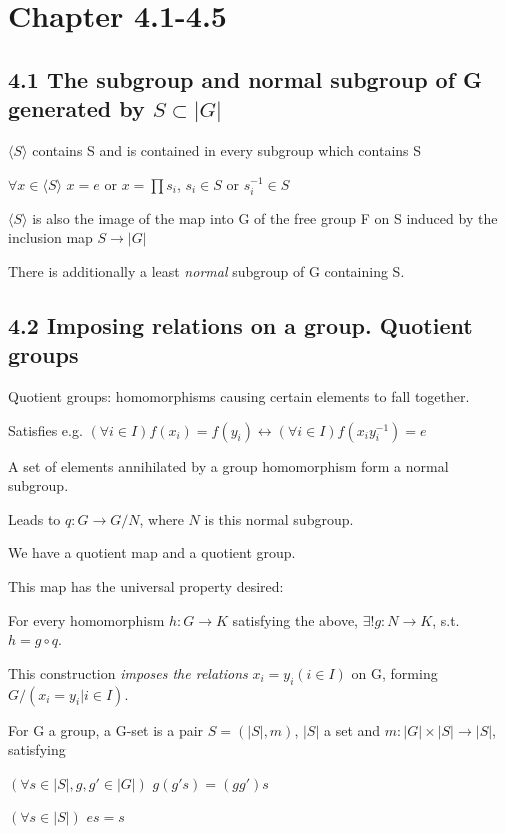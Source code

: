 \documentclass[12pt]{article}
\begin{document}
\section{Chapter 4.1-4.5}

\subsection{4.1 The subgroup and normal subgroup of G generated by $S \subset |G|$}


$\langle S \rangle$ contains S and is contained in every subgroup which contains S

$\forall x \in \langle S \rangle$ $x = e$ or $x = \prod s_i$, $s_i \in S$ or $s_i^{-1} \in S$

$\langle S \rangle$ is also the image of the map into G of the free group F on S induced by the inclusion map $S \to |G|$

There is additionally a least \textit{normal} subgroup of G containing S.

\subsection{4.2 Imposing relations on a group. Quotient groups}

Quotient groups: homomorphisms causing certain elements to fall together.

Satisfies e.g. $(\forall i \in I) f(x_i) = f(y_i) \leftrightarrow (\forall i \in I) f(x_iy_i^{-1}) = e$

A set of elements annihilated by a group homomorphism form a normal subgroup.

Leads to $q: G \to G\slash N$, where $N$ is this normal subgroup.

We have a quotient map and a quotient group.

\noindent
This map has the universal property desired:

For every homomorphism $h: G \to K$ satisfying the above, $\exists ! g : N \to K$, s.t. $h = g \circ q$.

\noindent
This construction \textit{imposes the relations} $x_i = y_i (i \in I)$ on G, forming $G \slash (x_i = y_i | i \in I)$.

\noindent
For G a group, a G-set is a pair $S = (|S|, m)$, $|S|$ a set and $m: |G| \times |S| \to |S|$, satisfying

$(\forall s \in |S|, g, g' \in |G|)$ $g(g's) = (gg')s$

$(\forall s \in |S|)$ $es = s$
\end{document}
